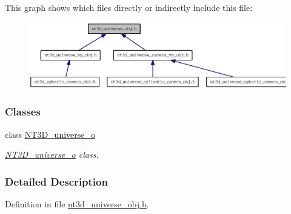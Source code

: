 This graph shows which files directly or indirectly include this file:
\nopagebreak
\begin{figure}[H]
\begin{center}
\leavevmode
\includegraphics[width=400pt]{nt3d__universe__obj_8h__dep__incl}
\end{center}
\end{figure}
\subsubsection*{Classes}
\begin{DoxyCompactItemize}
\item 
class \hyperlink{class_n_t3_d__universe__o}{NT3D\_\-universe\_\-o}
\begin{DoxyCompactList}\small\item\em \hyperlink{class_n_t3_d__universe__o}{NT3D\_\-universe\_\-o} class. \item\end{DoxyCompactList}\end{DoxyCompactItemize}


\subsubsection{Detailed Description}


Definition in file \hyperlink{nt3d__universe__obj_8h_source}{nt3d\_\-universe\_\-obj.h}.

